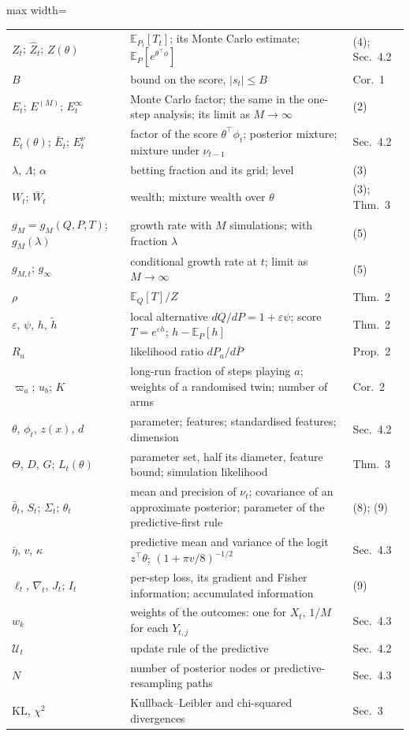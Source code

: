 \documentclass[11pt]{article}
\newcommand{\E}{\mathbb{E}}
\newcommand{\KL}{\mathrm{KL}}
\theoremstyle{remark}
\begin{document}
\begin{table}[H]
\begin{adjustbox}{max width=\textwidth}
\begin{tabular}{lll}
$Z_t$; $\widehat Z_t$; $Z(\theta)$ & $\E_{P_t}[T_t]$; its Monte Carlo estimate; $\E_P[e^{\theta^\top\phi}]$ & (4); Sec.~4.2 \\
$B$ & bound on the score, $|s_t| \le B$ & Cor.~1 \\
$E_t$; $E^{(M)}$; $E_t^\infty$ & Monte Carlo factor; the same in the one-step analysis; its limit as $M \to \infty$ & (2) \\
$E_t(\theta)$; $\bar E_t$; $E_t^{\nu}$ & factor of the score $\theta^\top\phi_t$; posterior mixture; mixture under $\nu_{t-1}$ & Sec.~4.2 \\
$\lambda$, $\Lambda$; $\alpha$ & betting fraction and its grid; level & (3) \\
$W_t$; $\bar W_t$ & wealth; mixture wealth over $\theta$ & (3); Thm.~3 \\
\midrule
$g_M = g_M(Q, P, T)$; $g_M(\lambda)$ & growth rate with $M$ simulations; with fraction $\lambda$ & (5) \\
$g_{M,t}$; $g_\infty$ & conditional growth rate at $t$; limit as $M \to \infty$ & (5) \\
$\rho$ & $\E_Q[T]/Z$ & Thm.~2 \\
$\varepsilon$, $\psi$, $h$, $\tilde h$ & local alternative $dQ/dP = 1 + \varepsilon\psi$; score $T = e^{\varepsilon h}$; $h - \E_P[h]$ & Thm.~2 \\
$R_a$ & likelihood ratio $dP_a/d\bar P$ & Prop.~2 \\
$\varpi_a$; $u_b$; $K$ & long-run fraction of steps playing $a$; weights of a randomised twin; number of arms & Cor.~2 \\
\midrule
$\theta$, $\phi_t$, $z(x)$, $d$ & parameter; features; standardised features; dimension & Sec.~4.2 \\
$\Theta$, $D$, $G$; $L_t(\theta)$ & parameter set, half its diameter, feature bound; simulation likelihood & Thm.~3 \\
$\bar\theta_t$, $S_t$; $\Sigma_t$; $\theta_t$ & mean and precision of $\nu_t$; covariance of an approximate posterior; parameter of the predictive-first rule & (8); (9) \\
$\bar\eta$, $v$, $\kappa$ & predictive mean and variance of the logit $z^\top\theta$; $(1 + \pi v/8)^{-1/2}$ & Sec.~4.3 \\
$\ell_t$, $\nabla_t$, $J_t$; $I_t$ & per-step loss, its gradient and Fisher information; accumulated information & (9) \\
$w_k$ & weights of the outcomes: one for $X_t$, $1/M$ for each $Y_{t,j}$ & Sec.~4.3 \\
$\mathcal U_t$ & update rule of the predictive & Sec.~4.2 \\
$N$ & number of posterior nodes or predictive-resampling paths & Sec.~4.3 \\
\midrule
$\KL$, $\chi^2$ & Kullback--Leibler and chi-squared divergences & Sec.~3 \\
\bottomrule
\end{tabular}
\end{adjustbox}
\end{table}
\end{document}
